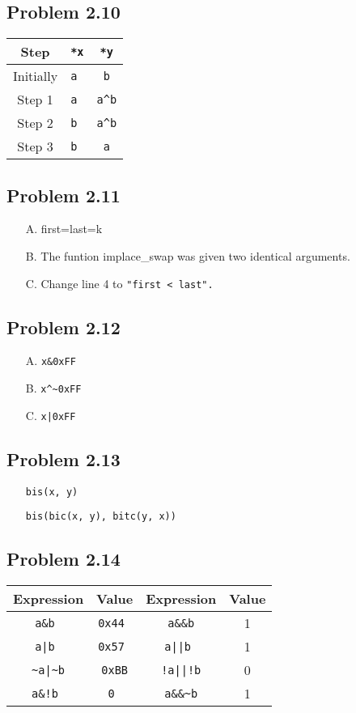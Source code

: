 \documentclass[a4paper]{article}
\newcommand{\wav}{\textasciitilde}
\begin{document}
\subsection*{Problem 2.10}
\begin{tabular}{ccc}
    Step&\tt{*x}&\tt{*y}\\
    \hline
    Initially   &\tt{a}  &\tt{b}\\
    Step 1      &\tt{a}  &\tt{a\^{}b}\\
    Step 2      &\tt{b}  &\tt{a\^{}b}\\
    Step 3      &\tt{b}  &\tt{a}
\end{tabular}

\subsection*{Problem 2.11}
\begin{enumerate}
    \item [A.] first=last=k
    \item [B.] The funtion implace\_swap was given two identical arguments.
    \item [C.] Change line 4 to \tt{"first < last"}.
\end{enumerate}

\subsection*{Problem 2.12}
\begin{enumerate}
    \item [A.] \tt{x\&0xFF}
    \item [B.] \tt{x\^{}\textasciitilde0xFF}
    \item [C.] \tt{x|0xFF}
\end{enumerate}

\subsection*{Problem 2.13}
\begin{itemize}
    \item[] \tt{bis(x, y)}
    \item[] \tt{bis(bic(x, y), bitc(y, x))} 
\end{itemize}

\subsection*{Problem 2.14}
\begin{tabular}{cccc}
    Expression  &Value      &Expression &Value\\
    \hline
    \tt{a\&b}   &\tt{0x44}  &\tt{a\&\&b}&1\\
    \tt{a|b}    &\tt{0x57}  &\tt{a||b}  &1\\
    \tt{\wav a|\wav b}&\tt{0xBB}&\tt{!a||!b}&0\\
    \tt{a\&!b}  &\tt{0}     &\tt{a\&\&\wav b}&1
    
\end{tabular}
\end{document}
